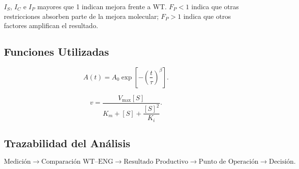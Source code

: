 \(I_S\), \(I_C\) e \(I_P\) mayores que 1 indican mejora frente a WT.
\(F_P<1\) indica que otras restricciones absorben parte de la mejora molecular;
\(F_P>1\) indica que otros factores amplifican el resultado.


\subsection{Funciones Utilizadas}
\label{anx:funciones}
\label{subsec:funciones_repro}

\begin{equation}
A(t)=
A_0
\exp\left[
-\left(
\frac{t}{\tau}
\right)^{\beta}
\right].
\end{equation}

\begin{equation}
v=
\frac{V_{\max}[S]}
{K_m+[S]+\dfrac{[S]^2}{K_i}}.
\end{equation}

\subsection{Trazabilidad del Análisis}
\label{anx:trazabilidad}
\label{subsec:trazabilidad}

\begin{equation}
\text{Medición}
\longrightarrow
\text{Comparación WT--ENG}
\longrightarrow
\text{Resultado Productivo}
\longrightarrow
\text{Punto de Operación}
\longrightarrow
\text{Decisión}.
\end{equation}
